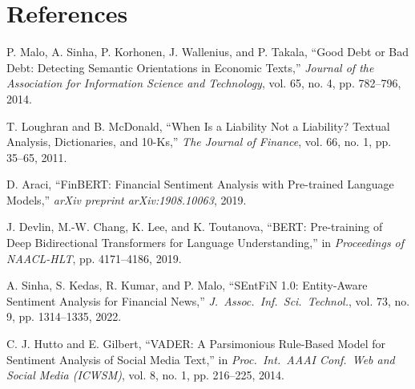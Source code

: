\documentclass[11pt,a4paper]{article}
\begin{document}
\section*{References}
\begin{enumerate}[label={[}\arabic*{]},topsep=1pt,itemsep=0.5pt,parsep=0pt,leftmargin=1.5em]
    \item P. Malo, A. Sinha, P. Korhonen, J. Wallenius, and P. Takala, ``Good Debt or Bad Debt: Detecting Semantic Orientations in Economic Texts,'' \textit{Journal of the Association for Information Science and Technology}, vol. 65, no. 4, pp. 782--796, 2014.
    \item T. Loughran and B. McDonald, ``When Is a Liability Not a Liability? Textual Analysis, Dictionaries, and 10-Ks,'' \textit{The Journal of Finance}, vol. 66, no. 1, pp. 35--65, 2011.
    \item D. Araci, ``FinBERT: Financial Sentiment Analysis with Pre-trained Language Models,'' \textit{arXiv preprint arXiv:1908.10063}, 2019.
    \item J. Devlin, M.-W. Chang, K. Lee, and K. Toutanova, ``BERT: Pre-training of Deep Bidirectional Transformers for Language Understanding,'' in \textit{Proceedings of NAACL-HLT}, pp. 4171--4186, 2019.
    \item A. Sinha, S. Kedas, R. Kumar, and P. Malo, ``SEntFiN 1.0: Entity-Aware Sentiment Analysis for Financial News,'' \textit{J.\ Assoc.\ Inf.\ Sci.\ Technol.}, vol. 73, no. 9, pp. 1314--1335, 2022.
    \item C. J. Hutto and E. Gilbert, ``VADER: A Parsimonious Rule-Based Model for Sentiment Analysis of Social Media Text,'' in \textit{Proc.\ Int.\ AAAI Conf.\ Web and Social Media (ICWSM)}, vol. 8, no. 1, pp. 216--225, 2014.
\end{enumerate}
\end{document}
